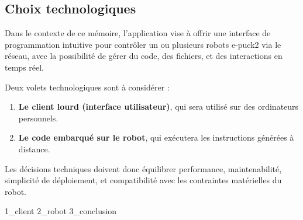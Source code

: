 \subsection{Choix technologiques} \label{sec:choix_technos}
Dans le contexte de ce mémoire, l'application vise à offrir une interface de programmation intuitive pour contrôler un ou plusieurs robots e-puck2 via le réseau, avec la possibilité de gérer du code, des fichiers, et des interactions en temps réel.

Deux volets technologiques sont à considérer :  
\begin{enumerate}
    \item \textbf{Le client lourd (interface utilisateur)}, qui sera utilisé sur des ordinateurs personnels.
    \item \textbf{Le code embarqué sur le robot}, qui exécutera les instructions générées à distance.
\end{enumerate}

Les décisions techniques doivent donc équilibrer performance, maintenabilité, simplicité de déploiement, et compatibilité avec les contraintes matérielles du robot.

{1_client}
{2_robot}
{3_conclusion}
